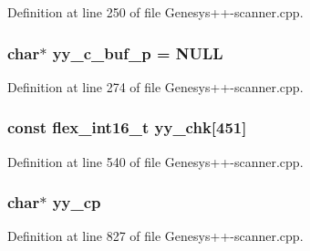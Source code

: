 Definition at line 250 of file Genesys++-\/scanner.\-cpp.

\hypertarget{_genesys_09_09-scanner_8cpp_ade8fc57d3529bff56440a4f3e9c29586}{
\subsubsection[{yy\-\_\-c\-\_\-buf\-\_\-p}]{\setlength{\rightskip}{0pt plus 5cm}char$\ast$ yy\-\_\-c\-\_\-buf\-\_\-p = N\-U\-L\-L\hspace{0.3cm}{\ttfamily [static]}}}\label{_genesys_09_09-scanner_8cpp_ade8fc57d3529bff56440a4f3e9c29586}


Definition at line 274 of file Genesys++-\/scanner.\-cpp.

\hypertarget{_genesys_09_09-scanner_8cpp_a9e979c5d6951ccdf702352bddc70c3cd}{
\subsubsection[{yy\-\_\-chk}]{\setlength{\rightskip}{0pt plus 5cm}const {\bf flex\-\_\-int16\-\_\-t} yy\-\_\-chk\mbox{[}451\mbox{]}\hspace{0.3cm}{\ttfamily [static]}}}\label{_genesys_09_09-scanner_8cpp_a9e979c5d6951ccdf702352bddc70c3cd}


Definition at line 540 of file Genesys++-\/scanner.\-cpp.

\hypertarget{_genesys_09_09-scanner_8cpp_a61b01b6b236b05090b972f8fd95da539}{
\subsubsection[{yy\-\_\-cp}]{\setlength{\rightskip}{0pt plus 5cm}char$\ast$ yy\-\_\-cp}}\label{_genesys_09_09-scanner_8cpp_a61b01b6b236b05090b972f8fd95da539}


Definition at line 827 of file Genesys++-\/scanner.\-cpp.

